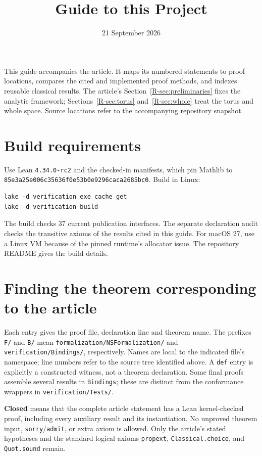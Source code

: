 \documentclass[11pt,a4paper]{article}
\title{Guide to this Project}
\author{}
\date{21 September 2026}
\newcommand{\code}[1]{\nolinkurl{#1}}
\newcommand{\paperref}[1]{\ref{R-#1}}
\begin{document}
\maketitle
\noindent This guide accompanies the article. It maps
its numbered statements to proof locations, compares the cited and implemented
proof methods, and indexes reusable classical results. The article's
Section~\paperref{sec:preliminaries} fixes the analytic framework;
Sections~\paperref{sec:torus} and~\paperref{sec:whole} treat the torus and
whole space. Source locations refer to the accompanying repository snapshot.

\section{Build requirements}\label{guide:build}
Use Lean \code{4.34.0-rc2} and the checked-in manifests, which pin Mathlib to
\code{85e3a25e006c35636f0e53b0e9296caca2685bc0}. Build in Linux:
\begin{verbatim}
lake -d verification exe cache get
lake -d verification build
\end{verbatim}
The build checks 37 current publication interfaces. The separate declaration
audit checks the transitive axioms of the results cited in this guide.
For macOS 27, use a Linux VM because of the pinned runtime's allocator issue.
The repository README gives the build details.

\section{Finding the theorem corresponding to the article}\label{guide:correspondence}
Each entry gives the proof file, declaration line and theorem name.
The prefixes \code{F/} and \code{B/} mean
\code{formalization/NSFormalization/} and \code{verification/Bindings/},
respectively. Names are local to the indicated file's namespace; line numbers
refer to the source tree identified above. A \code{def} entry is explicitly a constructed
witness, not a theorem declaration. Some final proofs assemble several
results in \code{Bindings}; these are distinct from the conformance wrappers
in \code{verification/Tests/}.

\textbf{Closed} means that the complete article statement has a Lean
kernel-checked proof, including every auxiliary result and its instantiation.
No unproved theorem input, \code{sorry}/\code{admit}, or extra axiom is allowed.
Only the article's stated hypotheses and the standard logical axioms
\code{propext}, \code{Classical.choice}, and \code{Quot.sound} remain.
\end{document}
